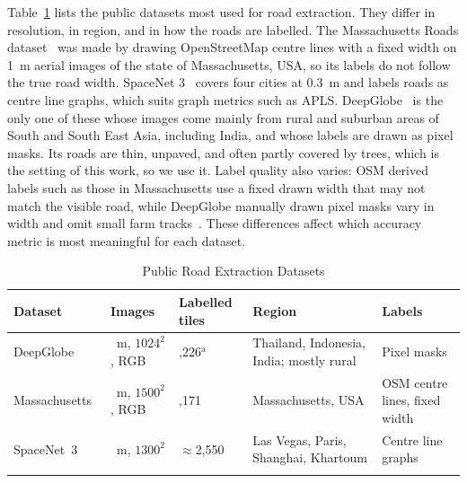 \documentclass{ieeeaccess}
\begin{document}
Table~\ref{tab:datasets} lists the public datasets most used for road extraction. They differ in resolution, in region, and in how the roads are labelled. The Massachusetts Roads dataset~\cite{mnih2013thesis} was made by drawing OpenStreetMap centre lines with a fixed width on 1~m aerial images of the state of Massachusetts, USA, so its labels do not follow the true road width. SpaceNet 3~\cite{vanetten2018spacenet} covers four cities at 0.3~m and labels roads as centre line graphs, which suits graph metrics such as APLS. DeepGlobe~\cite{demir2018deepglobe} is the only one of these whose images come mainly from rural and suburban areas of South and South East Asia, including India, and whose labels are drawn as pixel masks. Its roads are thin, unpaved, and often partly covered by trees, which is the setting of this work, so we use it. Label quality also varies: OSM derived labels such as those in Massachusetts use a fixed drawn width that may not match the visible road, while DeepGlobe manually drawn pixel masks vary in width and omit small farm tracks~\cite{demir2018deepglobe}. These differences affect which accuracy metric is most meaningful for each dataset.

\begin{table}[t]
\caption{Public Road Extraction Datasets}
\label{tab:datasets}
\setlength{\tabcolsep}{2pt}
\renewcommand{\arraystretch}{1.2}
{\small\tablebodyfont
\begin{tabular}{|>{\raggedright\arraybackslash}p{68pt}|>{\raggedright\arraybackslash}p{46pt}|>{\raggedright\arraybackslash}p{28pt}|>{\raggedright\arraybackslash}p{54pt}|>{\raggedright\arraybackslash}p{34pt}|}
\hline
Dataset & Images & Labelled tiles & Region & Labels \\
\hline
DeepGlobe~\cite{demir2018deepglobe} & 0.5~m, $1024^2$, RGB & 6,226$^{\mathrm{a}}$ & Thailand, Indonesia, India; mostly rural & Pixel masks \\
Massachusetts~\cite{mnih2013thesis} & 1~m, $1500^2$, RGB & 1,171 & Massachusetts, USA & OSM centre lines, fixed width \\
SpaceNet~3~\cite{vanetten2018spacenet} & 0.3~m, $1300^2$ & $\approx$2,550 & Las Vegas, Paris, Shanghai, Khartoum & Centre line graphs \\
\hline
\multicolumn{5}{p{238pt}}{$^{\mathrm{a}}$Of 8,570 tiles in total; only the training part of the challenge has public labels.}
\end{tabular}}
\renewcommand{\arraystretch}{1}
\end{table}
\end{document}
